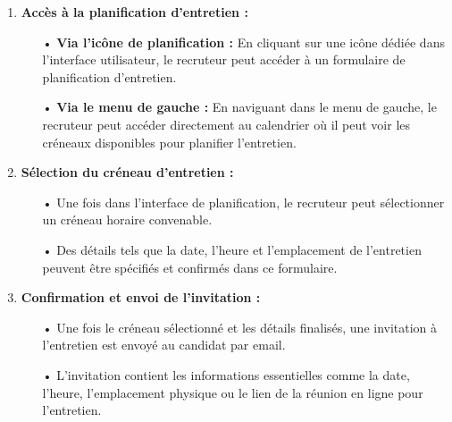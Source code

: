 \begin{enumerate}
    \item \textbf{Accès à la planification d'entretien :}
        \begin{itemize}
            \item[•] \textbf{Via l'icône de planification :} En cliquant sur une icône dédiée dans l'interface utilisateur, le recruteur peut accéder à un formulaire de planification d'entretien.
            \item[•] \textbf{Via le menu de gauche :} En naviguant dans le menu de gauche, le recruteur peut accéder directement au calendrier où il peut voir les créneaux disponibles pour planifier l'entretien.
        \end{itemize}
    
    \item \textbf{Sélection du créneau d'entretien :}
        \begin{itemize}
            \item[•] Une fois dans l'interface de planification, le recruteur peut sélectionner un créneau horaire convenable.
            \item[•] Des détails tels que la date, l'heure et l'emplacement de l'entretien peuvent être spécifiés et confirmés dans ce formulaire.
        \end{itemize}
    
    \item \textbf{Confirmation et envoi de l'invitation :}
        \begin{itemize}
            \item[•] Une fois le créneau sélectionné et les détails finalisés, une invitation à l'entretien est envoyé au candidat par email.
            \item[•] L'invitation contient les informations essentielles comme la date, l'heure, l'emplacement physique ou le lien de la réunion en ligne pour l'entretien.
            \\
            \\
            \\
            \\
         \\
         \\
         \end{itemize}
\end{enumerate}

